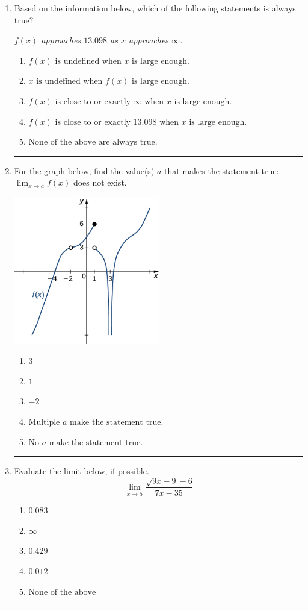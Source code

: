 \documentclass[14pt]{extbook}
\newcommand{\litem}[1]{\item#1\hspace*{-1cm}\rule{\textwidth}{0.4pt}}
\begin{document}
\begin{enumerate}
\litem{
Based on the information below, which of the following statements is always true?
\begin{center}
    \textit{ $f(x)$ approaches $13.098$ as $x$ approaches $\infty$. }
\end{center}
\begin{enumerate}[label=\Alph*.]
\item \( f(x) \text{ is undefined when } x \text{ is large enough}. \)
\item \( x \text{ is undefined when } f(x) \text{ is large enough}. \)
\item \( f(x) \text{ is close to or exactly } \infty \text{ when } x \text{ is large enough}. \)
\item \( f(x) \text{ is close to or exactly } 13.098 \text{ when } x \text{ is large enough}. \)
\item \( \text{None of the above are always true.} \)

\end{enumerate} }
\litem{
For the graph below, find the value(s) $a$ that makes the statement true: $ \displaystyle \lim_{x \rightarrow a} f(x)$ does not exist.
\begin{center}
    \includegraphics[width=0.5\textwidth]{../Figures/evaluateLimitGraphicallyCopyA.png}
\end{center}
\begin{enumerate}[label=\Alph*.]
\item \( 3 \)
\item \( 1 \)
\item \( -2 \)
\item \( \text{Multiple } a \text{ make the statement true}. \)
\item \( \text{No } a \text{ make the statement true}. \)

\end{enumerate} }
\litem{
Evaluate the limit below, if possible.\[ \lim_{x \rightarrow 5} \frac{\sqrt{9x - 9} - 6}{7x - 35} \]\begin{enumerate}[label=\Alph*.]
\item \( 0.083 \)
\item \( \infty \)
\item \( 0.429 \)
\item \( 0.012 \)
\item \( \text{None of the above} \)


\end{enumerate}}
\end{enumerate}
\end{document}
